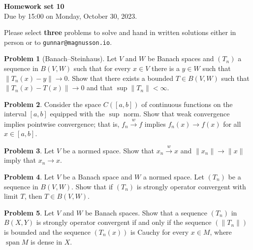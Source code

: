\documentclass[11pt]{article}
\theoremstyle{definition}
\newtheorem{prob}{Problem}
\def\head{
	\begin{center}
		\textbf{\LARGE Homework set 10}
		\\[3pt]
		Due by 15:00 on Monday, October 30, 2023.
	\end{center}
	\medskip
}
\begin{document}
\head

Please select \textbf{three} problems to solve and hand in written solutions
either in person or to \verb+gunnar@magnusson.io+.

\begin{prob}[Banach--Steinhaus]
	Let $V$ and $W$ be Banach spaces and $(T_n)$ a sequence in $B(V,W)$ such that
	for every $x \in V$ there is a $y \in W$ such that $\|T_n(x) - y \| \to 0$.
	Show that there exists a bounded $T \in B(V,W)$ such that $\|T_n(x) - T(x)\| \to 0$ and that $\sup \| T_n \| < \infty$.
\end{prob}

\begin{prob}
	Consider the space $C([a,b])$ of continuous functions on the interval $[a,b]$ equipped with the $\sup$ norm.
	Show that weak convergence implies pointwise convergence; that is,
	$f_n \stackrel{w}{\longrightarrow} f$ implies $f_n(x) \to f(x)$ for all $x \in [a,b]$.
\end{prob}

\begin{prob}
	Let $V$ be a normed space.
	Show that $x_n \stackrel{w}{\longrightarrow} x$ and $\| x_n \| \to \| x \|$ imply that $x_n \to x$.
\end{prob}

\begin{prob}
	Let $V$ be a Banach space and $W$ a normed space.
	Let $(T_n)$ be a sequence in $B(V,W)$.
	Show that if $(T_n)$ is strongly operator convergent with limit $T$, then $T \in B(V,W)$.
\end{prob}

\begin{prob}
	Let $V$ and $W$ be Banach spaces.
	Show that a sequence $(T_n)$ in $B(X,Y)$ is strongly operator convergent if and only if the sequence $(\|T_n\|)$ is bounded and the sequence $(T_n(x))$ is Cauchy for every $x \in M$, where $\operatorname{span} M$ is dense in $X$.
\end{prob}
\end{document}
